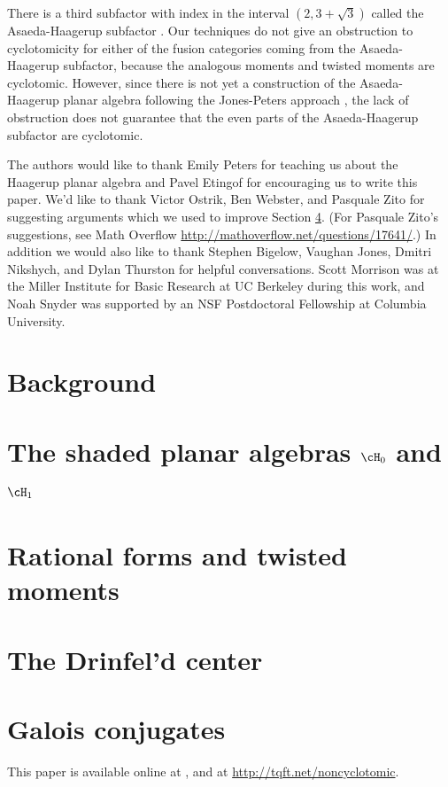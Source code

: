 \documentclass{gtart}
\begin{document}
There is a third subfactor with index in the interval $(2, 3+\sqrt{3})$ called the Asaeda-Haagerup subfactor \cite{MR1686551}.  Our techniques do not give an obstruction to cyclotomicity for either of the fusion categories coming from the Asaeda-Haagerup subfactor, because the analogous moments and twisted moments are cyclotomic.  However, since there is not yet a construction of the Asaeda-Haagerup planar algebra following the Jones-Peters approach \cite{quadratic, 0902.1294, 0909.4099}, the lack of obstruction does not guarantee that the even parts of the Asaeda-Haagerup subfactor are cyclotomic.

The authors would like to thank Emily Peters for teaching us about the Haagerup planar algebra and Pavel Etingof for encouraging us to write this paper.  We'd like to thank Victor Ostrik, Ben Webster, and Pasquale Zito for suggesting arguments which we used to improve Section \ref{sec:center}.  (For Pasquale Zito's suggestions, see Math Overflow \url{http://mathoverflow.net/questions/17641/}.)  In addition we would also like to thank Stephen Bigelow, Vaughan Jones, Dmitri Nikshych, and Dylan Thurston for helpful conversations.  Scott Morrison was at the Miller Institute for Basic Research at UC Berkeley during this work, and Noah Snyder was supported by an NSF Postdoctoral Fellowship at Columbia University.

\section{Background}
\label{sec:background}


\section{The shaded planar algebras $\cH_0$ and $\cH_1$}
\label{sec:construction}


\section{Rational forms and twisted moments}
\label{sec:noncyclotomic}


\section{The Drinfel'd center}
\label{sec:center}


\section{Galois conjugates}
\label{sec:galois}


\newcommand{\urlprefix}{}



This paper is available online at , and at
\url{http://tqft.net/noncyclotomic}.

\end{document}
